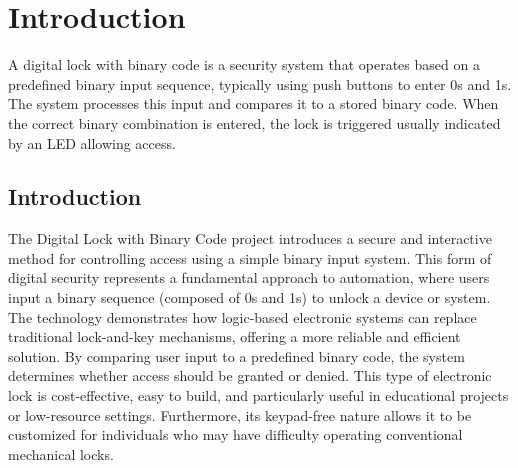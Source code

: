 \chapter{Introduction}
A digital lock with binary code is a security system that operates based on a predefined binary input sequence, typically using push buttons to enter 0s and 1s. The system processes this input and compares it to a stored binary code. When the correct binary combination is entered, the lock is triggered usually indicated by an LED allowing access. 
\justifying
\section{Introduction}
The Digital Lock with Binary Code project introduces a secure and interactive method for controlling access using a simple binary input system. This form of digital security represents a fundamental approach to automation, where users input a binary sequence (composed of 0s and 1s) to unlock a device or system. The technology demonstrates how logic-based electronic systems can replace traditional lock-and-key mechanisms, offering a more reliable and efficient solution. By comparing user input to a predefined binary code, the system determines whether access should be granted or denied. This type of electronic lock is cost-effective, easy to build, and particularly useful in educational projects or low-resource settings. Furthermore, its keypad-free nature allows it to be customized for individuals who may have difficulty operating conventional mechanical locks.\cite{1.1}
